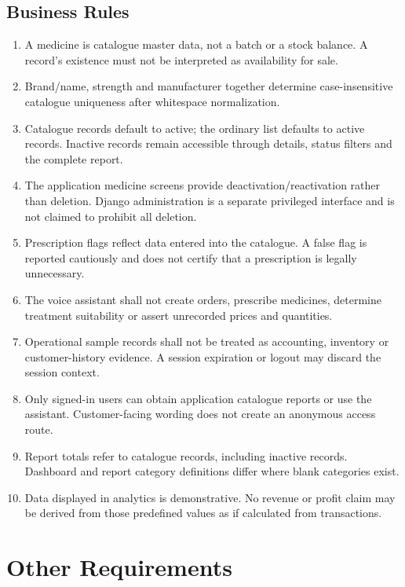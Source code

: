 \documentclass{article}
\begin{document}
\subsection{Business Rules}
\begin{enumerate}[label=BR-\arabic*.,leftmargin=19mm]
\item A medicine is catalogue master data, not a batch or a stock balance. A record's existence must not be interpreted as availability for sale.
\item Brand/name, strength and manufacturer together determine case-insensitive catalogue uniqueness after whitespace normalization.
\item Catalogue records default to active; the ordinary list defaults to active records. Inactive records remain accessible through details, status filters and the complete report.
\item The application medicine screens provide deactivation/reactivation rather than deletion. Django administration is a separate privileged interface and is not claimed to prohibit all deletion.
\item Prescription flags reflect data entered into the catalogue. A false flag is reported cautiously and does not certify that a prescription is legally unnecessary.
\item The voice assistant shall not create orders, prescribe medicines, determine treatment suitability or assert unrecorded prices and quantities.
\item Operational sample records shall not be treated as accounting, inventory or customer-history evidence. A session expiration or logout may discard the session context.
\item Only signed-in users can obtain application catalogue reports or use the assistant. Customer-facing wording does not create an anonymous access route.
\item Report totals refer to catalogue records, including inactive records. Dashboard and report category definitions differ where blank categories exist.
\item Data displayed in analytics is demonstrative. No revenue or profit claim may be derived from those predefined values as if calculated from transactions.
\end{enumerate}

\clearpage
\section{Other Requirements}
\end{document}
